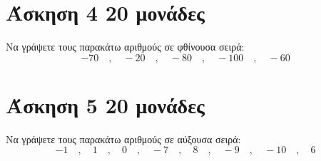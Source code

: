 \documentclass[a4paper,10pt]{report}
\begin{document}
\section*{Άσκηση 4  \hfill \small{20 μονάδες}}
Να γράψετε τους παρακάτω αριθμούς σε φθίνουσα σειρά: 
$$ -70 \quad , \quad -20 \quad , \quad -80 \quad , \quad -100 \quad , \quad -60    $$



\section*{Άσκηση 5  \hfill \small{20 μονάδες}}
Να γράψετε τους παρακάτω αριθμούς σε αύξουσα σειρά: 
$$ -1 \quad , \quad 1 \quad , \quad 0 \quad , \quad -7 \quad , \quad 8 \quad , \quad -9 \quad , \quad -10 \quad ,\quad 6 $$
\end{document}
